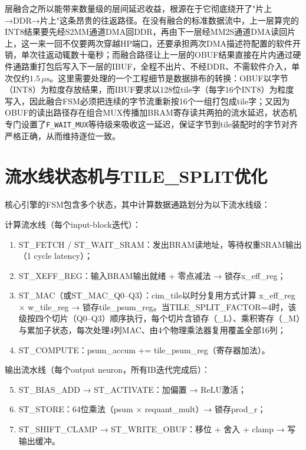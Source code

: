 \documentclass[bachelor,compact,nofont]{xjtuthesis}
\numberwithin{equation}{chapter}
\begin{document}
层融合之所以能带来数量级的层间延迟收益，根源在于它彻底绕开了"片上→DDR→片上"这条昂贵的往返路径。在没有融合的标准数据流中，上一层算完的INT8结果要先经S2MM通道DMA回DDR，再由下一层经MM2S通道DMA读回片上，这一来一回不仅要两次穿越HP端口，还要承担两次DMA描述符配置的软件开销，单次往返动辄数十毫秒；而融合路径让上一层的OBUF结果直接在片内通过硬件通路重打包后写入下一层的IBUF，全程不出片、不经DDR、不需软件介入，单次仅约$1.5\,\mu\text{s}$。这里需要处理的一个工程细节是数据排布的转换：OBUF以字节（INT8）为粒度存放结果，而IBUF要求以128位tile字（每字16个INT8）为粒度写入，因此融合FSM必须把连续的字节流重新按16个一组打包成tile字；又因为OBUF的读出路径存在组合MUX传播加BRAM寄存读共两拍的流水延迟，状态机专门设置了\texttt{F\_WAIT\_MUX}等待级来吸收这一延迟，保证字节到tile装配时的字节对齐严格正确，从而维持逐位一致。

\section{流水线状态机与TILE\_SPLIT优化}

核心引擎的FSM包含多个状态，其中计算数据通路划分为以下流水线级：

计算流水线（每个input-block迭代）：
\begin{enumerate}
	\item ST\_FETCH / ST\_WAIT\_SRAM：发出BRAM读地址，等待权重SRAM输出（1 cycle latency）；
	\item ST\_XEFF\_REG：输入BRAM输出就绪 + 零点减法 → 锁存x\_eff\_reg；
	\item ST\_MAC（或ST\_MAC\_Q0--Q3）：cim\_tile以时分复用方式计算 x\_eff\_reg $\times$ w\_tile\_reg → 锁存tile\_psum\_reg。当TILE\_SPLIT\_FACTOR=4时，该级按四个切片（Q0--Q3）顺序执行，每个切片含锁存（\_L）、乘积寄存（\_M）与累加子状态，每次处理4列MAC、由4个物理乘法器复用覆盖全部16列；
	\item ST\_COMPUTE：psum\_accum += tile\_psum\_reg（寄存器加法）。
\end{enumerate}

输出流水线（每个output neuron，所有IB迭代完成后）：
\begin{enumerate}
	\setcounter{enumi}{4}
	\item ST\_BIAS\_ADD → ST\_ACTIVATE：加偏置 → ReLU激活；
	\item ST\_STORE：64位乘法（psum $\times$ requant\_mult）→ 锁存prod\_r；
	\item ST\_SHIFT\_CLAMP → ST\_WRITE\_OBUF：移位 + 舍入 + clamp → 写输出缓冲。
\end{enumerate}
\end{document}
